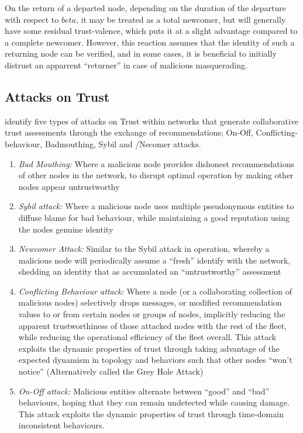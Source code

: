 On the return of a departed node, depending on the duration of the departure with respect to $beta$, it may be treated as a total newcomer, but will generally have some residual trust-valence, which puts it at a slight advantage compared to a complete newcomer. 
However, this reaction assumes that the identity of such a returning node can be verified, and in some cases, it is beneficial to initially distrust an apparrent ``returner'' in case of malicious masquerading.

\subsection{Attacks on Trust}

\citet{Liu2010} identify five types of attacks on Trust within networks that generate collaborative trust assessments through the exchange of recommendations; On-Off, Conflicting-behaviour, Badmouthing, Sybil and /Necomer attacks.

\begin{enumerate}
	\item \emph{Bad Mouthing:} Where a malicious node provides dishonest recommendations of other nodes in the network, to disrupt optimal operation  by making other nodes appear untrustworthy
	\item \emph{Sybil attack:} Where a malicious node uses multiple pseudonymous entities to diffuse blame for bad behaviour, while maintaining a good reputation using the nodes genuine identity
	\item \emph{Newcomer Attack:} Similar to the Sybil attack in operation, whereby a malicious node will periodically assume a ``fresh'' identify with the network, shedding an identity that as accumulated an ``untrustworthy'' assessment
	\item \emph{Conflicting Behaviour attack:} Where a node (or a collaborating collection of malicious nodes) selectively drops messages, or modified recommendation values to or from certain nodes or groups of nodes, implicitly reducing the apparent trustworthiness of those attacked nodes with the rest of the fleet, while reducing the operational efficiency of the fleet overall.  This attack exploits the dynamic properties of trust through taking advantage of the expected dynamism in topology and behaviors such that other nodes ``won't notice'' (Alternatively called the Grey Hole Attack)
	\item \emph{On-Off attack:} Malicious entities alternate between ``good'' and ``bad'' behaviours, hoping that they can remain undetected while causing damage. This attack exploits the dynamic properties of trust through time-domain inconsistent behaviours.
\end{enumerate} 

